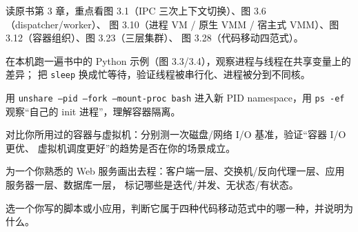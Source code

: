 
\begin{actions}
  \item 读原书第 3 章，重点看图 3.1（IPC 三次上下文切换）、图 3.6（dispatcher/worker）、
        图 3.10（进程 VM / 原生 VMM / 宿主式 VMM）、图 3.12（容器组织）、图 3.23（三层集群）、
        图 3.28（代码移动四范式）。
  \item 在本机跑一遍书中的 Python 示例（图 3.3/3.4），观察进程与线程在共享变量上的差异；
        把 \texttt{sleep} 换成忙等待，验证线程被串行化、进程被分到不同核。
  \item 用 \texttt{unshare --pid --fork --mount-proc bash} 进入新 PID namespace，用 \texttt{ps -ef}
        观察“自己的 init 进程”，理解容器隔离。
  \item 对比你所用过的容器与虚拟机：分别测一次磁盘/网络 I/O 基准，验证“容器 I/O 更优、
        虚拟机调度更好”的趋势是否在你的场景成立。
  \item 为一个你熟悉的 Web 服务画出去程：客户端一层、交换机/反向代理一层、应用服务器一层、数据库一层，
        标记哪些是迭代/并发、无状态/有状态。
  \item 选一个你写的脚本或小应用，判断它属于四种代码移动范式中的哪一种，并说明为什么。
\end{actions}
